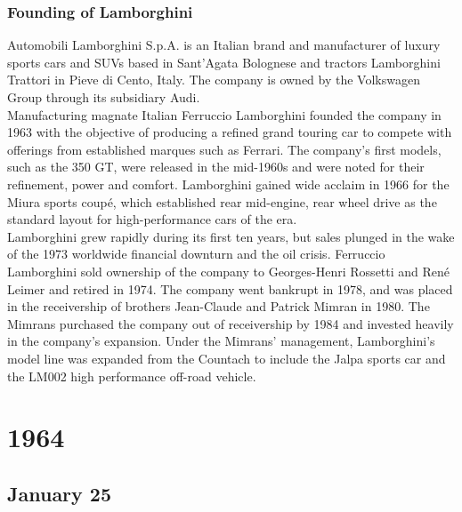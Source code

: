 \documentclass[11pt]{report}
\begin{document}
\subsection{Founding of Lamborghini}
Automobili Lamborghini S.p.A. is an Italian brand and manufacturer of luxury sports cars and SUVs based in Sant'Agata Bolognese and tractors Lamborghini Trattori in Pieve di Cento, Italy. The company is owned by the Volkswagen Group through its subsidiary Audi.\\ \indent Manufacturing magnate Italian Ferruccio Lamborghini founded the company in 1963 with the objective of producing a refined grand touring car to compete with offerings from established marques such as Ferrari. The company's first models, such as the 350 GT, were released in the mid-1960s and were noted for their refinement, power and comfort. Lamborghini gained wide acclaim in 1966 for the Miura sports coupé, which established rear mid-engine, rear wheel drive as the standard layout for high-performance cars of the era.\\
\indent Lamborghini grew rapidly during its first ten years, but sales plunged in the wake of the 1973 worldwide financial downturn and the oil crisis. Ferruccio Lamborghini sold ownership of the company to Georges-Henri Rossetti and René Leimer and retired in 1974. The company went bankrupt in 1978, and was placed in the receivership of brothers Jean-Claude and Patrick Mimran in 1980. The Mimrans purchased the company out of receivership by 1984 and invested heavily in the company's expansion. Under the Mimrans' management, Lamborghini's model line was expanded from the Countach to include the Jalpa sports car and the LM002 high performance off-road vehicle.

\chapter{1964}
\section{January 25}
\end{document}
